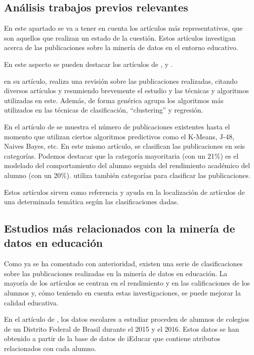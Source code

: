 \subsection{Análisis trabajos previos relevantes}
En este apartado se va a tener en cuenta los artículos más representativos, que son aquellos que realizan un estado de la cuestión. Estos artículos investigan acerca de las publicaciones sobre la minería de datos en el entorno educativo.

En este aspecto se pueden destacar los artículos de ,  y .

 en su artículo, realiza una revisión sobre las publicaciones realizadas, citando diversos artículos y resumiendo brevemente el estudio y las técnicas y algoritmos utilizadas en este. Además, de forma genérica agrupa los algoritmos más utilizados en las técnicas de clasificación, ``clustering'' y regresión.

En el artículo de  se muestra el número de publicaciones existentes hasta el momento que utilizan ciertos algoritmos predictivos como el K-Means, J-48, Naives Bayes, etc. En este mismo artículo, se clasifican las publicaciones en seis categorías. Podemos destacar que la categoría mayoritaria (con un 21\%) es el modelado del comportamiento del alumno seguida del rendimiento académico del alumno (con un 20\%).  utiliza también categorías para clasificar las publicaciones.

Estos artículos sirven como referencia y ayuda en la localización de artículos de una determinada temática según las clasificaciones dadas.

\subsection{Estudios más relacionados con la minería de datos en educación}
Como ya se ha comentado con anterioridad, existen una serie de clasificaciones sobre las publicaciones realizadas en la minería de datos en educación. La mayoría de los artículos se centran en el rendimiento y en las calificaciones de los alumnos y, cómo teniendo en cuenta estas investigaciones, se puede mejorar la calidad educativa.

En el artículo de , los datos escolares a estudiar proceden de alumnos de colegios de un Distrito Federal de Brasil durante el 2015 y el 2016. Estos datos se han obtenido a partir de la base de datos de iEducar que contiene atributos relacionados con cada alumno. 

